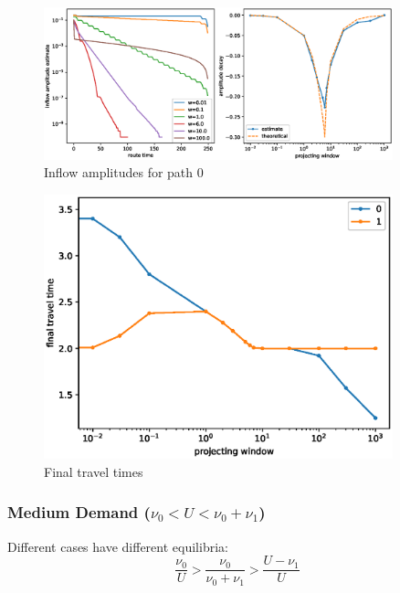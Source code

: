 \documentclass[12pt]{article}
\begin{document}
\begin{figure}
	\includegraphics[width=0.9\textwidth]{img/amplitudes_proj_tt.eps}
	\caption{ Inflow amplitudes for path 0 }
	\label{fig:amplitudes_proj}

\end{figure}

\begin{figure}
	\includegraphics[width=0.9\textwidth]{img/final_tt_proj.eps}
	\caption{ Final travel times }
	\label{fig:final_tt_proj}

\end{figure}

%

\newpage
\subsubsection*{Medium Demand ($ \nu_0 < U < \nu_0 + \nu_1$)}

Different cases have different equilibria:
$$ \frac{\nu_0}{U} > \frac{\nu_0}{\nu_0 + \nu_1} > \frac{U - \nu_1}{U}$$
\end{document}
